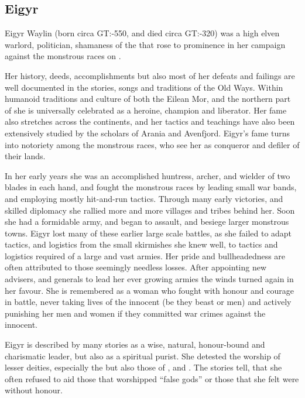 \ifimages
\clearpage
{}
\clearpage
\fi

\subsection{Eigyr}
\label{sec:Eigyr}

Eigyr Waylin (born circa GT:-550, and died circa GT:-320) was a high elven
warlord, politician, shamaness of the  that rose to
prominence in her campaign against the monstrous races on .

Her history, deeds, accomplishments but also most of her defeats and failings
are well documented in the stories, songs and traditions of the Old Ways. Within
humanoid traditions and culture of both the Eilean Mor, and the northern part of
 she is universally celebrated as a heroine, champion and
liberator. Her fame also stretches across the continents, and her tactics and
teachings have also been extensively studied by the scholars of Arania and
Avenfjord. Eigyr's fame turns into notoriety among the monstrous races, who see
her as conqueror and defiler of their lands.

In her early years she was an accomplished huntress, archer, and wielder of
two blades in each hand, and fought the monstrous races by leading small war
bands, and employing mostly hit-and-run tactics. Through many early victories,
and skilled diplomacy she rallied more and more villages and tribes behind
her. Soon she had a formidable army, and began to assault, and besiege larger
monstrous towns. Eigyr lost many of these earlier large scale battles, as she
failed to adapt tactics, and logistics from the small skirmishes she knew well,
to tactics and logistics required of a large and vast armies. Her pride and
bullheadedness are often attributed to those seemingly needless losses.  After
appointing new advisers, and generals to lead her ever growing armies the winds
turned again in her favour. She is remembered as a woman who fought with
honour and courage in battle, never taking lives of the innocent (be they
beast or men) and actively punishing her men and women if they committed war
crimes against the innocent.

Eigyr is described by many stories as a wise, natural, honour-bound and
charismatic leader, but also as a spiritual purist. She detested the worship
of lesser deities, especially the  but also those of
, and . The stories tell, that she often
refused to aid those that worshipped ``false gods'' or those that she felt were
without honour.


